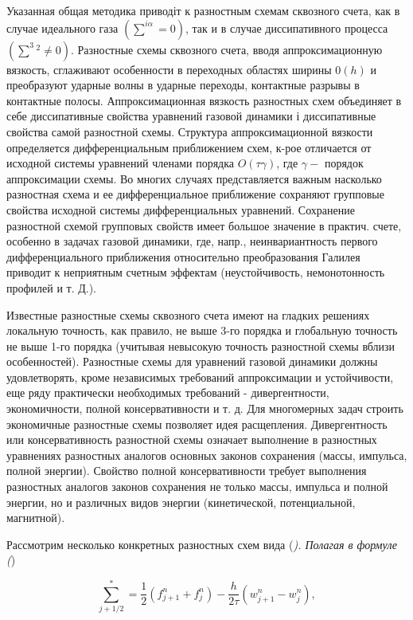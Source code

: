 \documentclass[10pt]{article}
\begin{document}
Указанная общая методика приводіт к разностным схемам сквозного счета, как в случае идеального газа $\left(\sum^{i \alpha}=0\right)$, так и в случае диссипативного процесса $\left(\sum^{3}{ }^{2} \neq 0\right)$. Разностные схемы сквозного счета, вводя аппроксимационную вязкость, сглаживают особенности в переходных областях ширины $0(h)$ и преобразуют ударные волны в ударные переходы, контактные разрывы в контактные полосы. Аппроксимационная вязкость разностных схем объединяет в себе диссипативные свойства уравнений газовой динамики і диссипативные свойства самой разностной схемы. Структура аппроксимационной вязкости определяется дифференциальным приближением схем, к-рое отличается от исходной системы уравнений членами порядка $O(\tau \mathcal{\gamma})$, где $\gamma-$ порядок аппроксимации схемы. Во многих случаях представляется важным насколько разностная схема и ее дифференциальное приближение сохраняют групповые свойства исходной системы дифференциальных уравнений. Сохранение разностной схемой групповых свойств имеет большое значение в практич. счете, особенно в задачах газовой динамики, где, напр., неинвариантность первого дифференциального приближения относительно преобразования Галилея приводит к неприятным счетным эффектам (неустойчивость, немонотонность профилей и т. Д.).



Известные разностные схемы сквозного счета имеют на гладких решениях локальную точность, как правило, не выше 3-го порядка и глобальную точность не выше 1-го порядка (учитывая невысокую точность разностной схемы вблизи особенностей). Разностные схемы для уравнений газовой динамики должны удовлетворять, кроме независимых требований аппроксимации и устойчивости, еще ряду практически необходимых требований - дивергентности, экономичности, полной консервативности и т. д. Для многомерных задач строить экономичные разностные схемы позволяет идея расщепления. Дивергентность или консервативность разностной схемы означает выполнение в разностных уравнениях разностных аналогов основных законов сохранения (массы, импульса, полной энергии). Свойство полной консервативности требует выполнения разностных аналогов законов сохранения не только массы, импульса и полной энергии, но и различных видов энергии (кинетической, потенциальной, магнитной).



Рассмотрим несколько конкретных разностных схем вида (\textit{). Полагая в формуле (})



\[

\sum_{j+1 / 2}^{*}=\frac{1}{2}\left(f_{j+1}^{n}+f_{j}^{n}\right)-\frac{h}{2 \tau}\left(w_{j+1}^{n}-w_{j}^{n}\right),

\]
\end{document}

